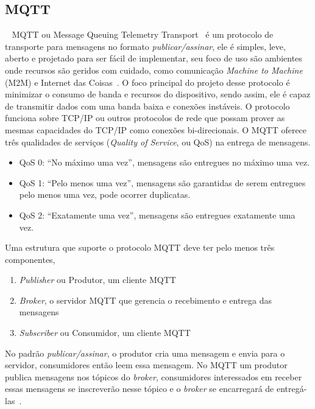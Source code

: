 \subsection{MQTT}
~\label{sec:mqtt}
MQTT ou Message Queuing Telemetry Transport~\cite{ISO20922} é um protocolo de transporte para mensagens no formato \emph{publicar/assinar},
ele é simples, leve, aberto e projetado para ser fácil de implementar, seu foco de uso são ambientes onde recursos são geridos com cuidado,
como comunicação \emph{Machine to Machine} (M2M) e Internet das Coisas~\cite{MQTT5}. O foco principal do projeto desse protocolo é minimizar
o consumo de banda e recursos do dispositivo, sendo assim, ele é capaz de transmitir dados com uma banda baixa e conexões instáveis.
O protocolo funciona sobre TCP/IP ou outros protocolos de rede que possam prover as mesmas capacidades do TCP/IP como conexões bi-direcionais.
O MQTT oferece três qualidades de serviços (\emph{Quality of Service}, ou QoS) na entrega de mensagens.
\begin{itemize}
    \item QoS 0: ``No máximo uma vez'', mensagens são entregues no máximo uma vez.
    \item QoS 1: ``Pelo menos uma vez'', mensagens são garantidas de serem entregues pelo menos uma vez, pode ocorrer duplicatas.
    \item QoS 2: ``Exatamente uma vez'', mensagens são entregues exatamente uma vez.
\end{itemize}
Uma estrutura que suporte o protocolo MQTT deve ter pelo menos três componentes,
\begin{enumerate}
    \item \emph{Publisher} ou Produtor, um cliente MQTT
    \item \emph{Broker}, o servidor MQTT que gerencia o recebimento e entrega das mensagens
    \item \emph{Subscriber} ou Consumidor, um cliente MQTT
\end{enumerate}
No padrão \emph{publicar/assinar}, o produtor cria uma mensagem e envia para o servidor, consumidores então leem essa mensagem.
No MQTT um produtor publica mensagens nos tópicos do \emph{broker}, consumidores interessados em receber essas mensagens se
inscreverão nesse tópico e o \emph{broker} se encarregará de entregá-las~\cite{Mishra2020}.

